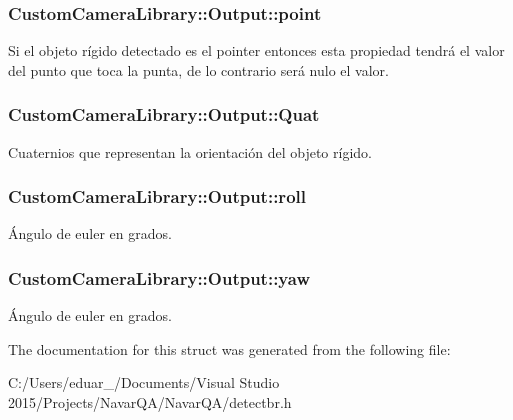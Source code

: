 \subsubsection[{\texorpdfstring{point}{point}}]{\setlength{\rightskip}{0pt plus 5cm}Custom\+Camera\+Library\+::\+Output\+::point}\hypertarget{struct_custom_camera_library_1_1_output_aa8d02d07cd889dd98ed76942616cd06c}{}\label{struct_custom_camera_library_1_1_output_aa8d02d07cd889dd98ed76942616cd06c}
Si el objeto rígido detectado es el pointer entonces esta propiedad tendrá el valor del punto que toca la punta, de lo contrario será nulo el valor. 
\subsubsection[{\texorpdfstring{Quat}{Quat}}]{\setlength{\rightskip}{0pt plus 5cm}Custom\+Camera\+Library\+::\+Output\+::\+Quat}\hypertarget{struct_custom_camera_library_1_1_output_a5fab2e3e26e7e4ebb82046f2c28899a7}{}\label{struct_custom_camera_library_1_1_output_a5fab2e3e26e7e4ebb82046f2c28899a7}
Cuaternios que representan la orientación del objeto rígido. 
\subsubsection[{\texorpdfstring{roll}{roll}}]{\setlength{\rightskip}{0pt plus 5cm}Custom\+Camera\+Library\+::\+Output\+::roll}\hypertarget{struct_custom_camera_library_1_1_output_a9383b78c1f441b6c816533c0011c2478}{}\label{struct_custom_camera_library_1_1_output_a9383b78c1f441b6c816533c0011c2478}
Ángulo de euler en grados. 
\subsubsection[{\texorpdfstring{yaw}{yaw}}]{\setlength{\rightskip}{0pt plus 5cm}Custom\+Camera\+Library\+::\+Output\+::yaw}\hypertarget{struct_custom_camera_library_1_1_output_a7fa444f6b387695a1b29c460fe5f1bad}{}\label{struct_custom_camera_library_1_1_output_a7fa444f6b387695a1b29c460fe5f1bad}
Ángulo de euler en grados. 

The documentation for this struct was generated from the following file\+:\begin{DoxyCompactItemize}
\item 
C\+:/\+Users/eduar\+\_/\+Documents/\+Visual Studio 2015/\+Projects/\+Navar\+Q\+A/\+Navar\+Q\+A/detectbr.\+h\end{DoxyCompactItemize}
